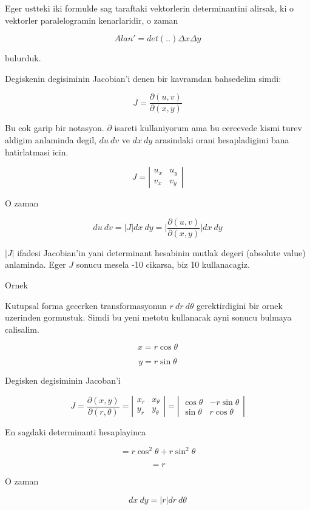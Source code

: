 \documentclass[12pt,fleqn]{article}\usepackage{../common}
\begin{document}
Eger ustteki iki formulde sag taraftaki vektorlerin determinantini alirsak,
ki o vektorler paralelogramin kenarlaridir, o zaman 

\[ Alan' =  det(..)\Delta x \Delta y  \]

bulurduk. 

Degiskenin degisiminin Jacobian'i denen bir kavramdan bahsedelim simdi: 

\[ J = \frac{\partial (u,v)}{\partial(x,y)} \]

Bu cok garip bir notasyon. $\partial$ isareti kullaniyorum ama bu cercevede
kismi turev aldigim anlaminda degil, $du \ dv$ ve $dx \ dy$ arasindaki
orani hesapladigimi bana hatirlatmasi icin. 

\[ J =  \left|\begin{array}{rr}
u_x & u_y \\
v_x & v_y
\end{array}\right|
\]

O zaman 

\[ du \ dv = 
|J| dx \ dy = 
\bigg|\frac{\partial (u,v)}{\partial(x,y)}\bigg| dx \ dy
 \]

$|J|$ ifadesi Jacobian'in yani determinant hesabinin mutlak degeri (absolute
value) anlaminda. Eger $J$ sonucu mesela -10 cikarsa, biz 10 kullanacagiz. 

Ornek 

Kutupsal forma gecerken transformasyonun $r \ dr \ d\theta$ gerektirdigini
bir ornek uzerinden gormustuk. Simdi bu yeni metotu kullanarak ayni sonucu
bulmaya calisalim. 

\[  x= r \cos \theta \]

\[  y= r \sin\theta \]

Degisken degisiminin Jacoban'i

\[ J = \frac{\partial (x,y)}{\partial(r,\theta)}  =
\left|\begin{array}{rr}
x_r & x_\theta \\
y_r & y_\theta
\end{array}\right|   =
\left|\begin{array}{rr}
\cos\theta & -r\sin\theta\\
\sin\theta & r\cos\theta
\end{array}\right|
\]

En sagdaki determinanti hesaplayinca

\[ = r\cos^2\theta + r\sin^2\theta \]

\[ = r \]

O zaman 

\[ dx \ dy = |r| dr \ d\theta \]
\end{document}
